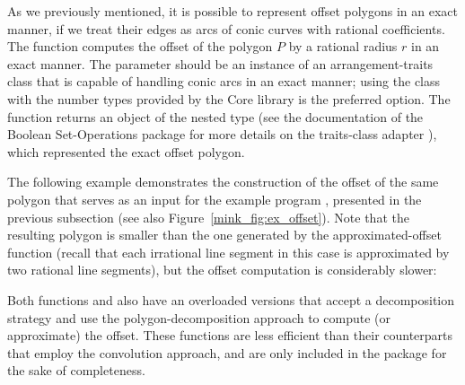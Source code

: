 As we previously mentioned, it is possible to represent offset polygons
in an exact manner, if we treat their edges as arcs of conic curves with
rational coefficients. The function 
computes the offset of the polygon $P$ by a rational radius $r$ in an
exact manner. The  parameter should be an instance of an
arrangement-traits class that is capable of handling conic arcs in an
exact manner; using the  class with the number
types provided by the {\sc Core} library is the preferred option.
The function returns an object of the nested type
 (see the
documentation of the Boolean Set-Operations package for more details
on the traits-class adapter ), which represented the
exact offset polygon.

The following example demonstrates the construction of the offset
of the same polygon that serves as an input for the example program
, presented in the previous subsection (see also
Figure~\ref{mink_fig:ex_offset}). Note that the resulting polygon is
smaller than the one generated by the approximated-offset function (recall
that each irrational line segment in this case is approximated by two
rational line segments), but the offset computation is considerably slower:


\begin{ccAdvanced}
Both functions  and 
also have an overloaded versions that accept a decomposition strategy
and use the polygon-decomposition approach to compute (or approximate)
the offset. These functions are less efficient than their counterparts
that employ the convolution approach, and are only included in the package
for the sake of completeness.
\end{ccAdvanced}


